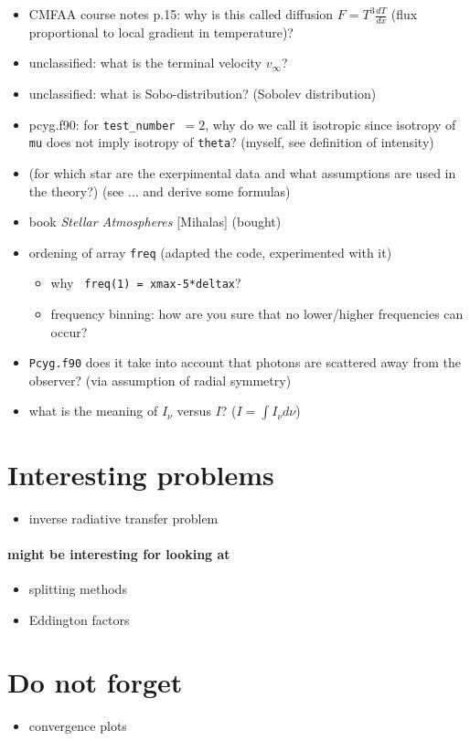 \documentclass[../main/main.tex]{subfiles}
\begin{document}
\begin{itemize}
\item CMFAA course notes p.15: why is this called diffusion $F=T^3 \frac{dT}{dx}$ (flux proportional to local gradient in temperature)?

\item unclassified: what is the terminal velocity $v_{\infty}$?

\item unclassified: what is Sobo-distribution? (Sobolev distribution)

\item pcyg.f90: for \texttt{test\_number $= 2$}, why do we call it isotropic since isotropy of \texttt{mu} does not imply isotropy of \texttt{theta}? (myself, see definition of intensity)

\item (for which star are the exerpimental data and what assumptions are used in the theory?) (see ... and derive some formulas)

\item book \textit{Stellar Atmospheres} [Mihalas] (bought)

\item ordening of array \texttt{freq} (adapted the code, experimented with it)
\begin{itemize}
\item why \texttt{ freq(1) = xmax-5*deltax}?   
\item frequency binning: how are you sure that no lower/higher frequencies can occur?
\\
\noindent{}
\end{itemize}

\item \texttt{Pcyg.f90} does it take into account that photons are scattered away from the observer? (via assumption of radial symmetry)

\item what is the meaning of $I_{\nu}$ versus $I$? ($I = \int I_{\nu} d\nu$)
\end{itemize}

\newpage
\section{Interesting problems}
\begin{itemize}
\item inverse radiative transfer problem
\end{itemize}

\paragraph{might be interesting for looking at}
\begin{itemize}
\item splitting methods
\item Eddington factors
\end{itemize}

\section{Do not forget}
\begin{itemize}
\item convergence plots
\end{itemize}
\end{document}
